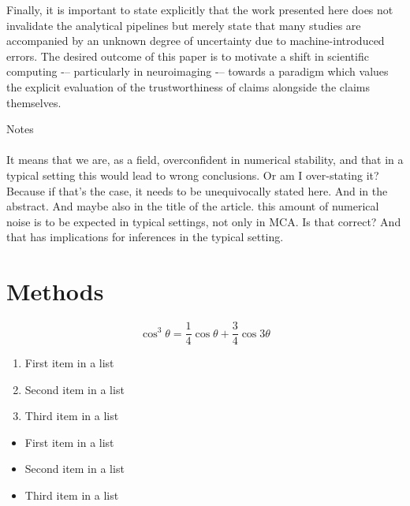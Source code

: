 \documentclass[fleqn,10pt]{SelfArx} %
\begin{document}
Finally, it is important to state explicitly that the work presented here does not invalidate the analytical pipelines
but merely state that many studies are accompanied by an unknown degree of uncertainty due to machine-introduced
errors. The desired outcome of this paper is to motivate a shift in scientific computing -– particularly in
neuroimaging -– towards a paradigm which values the explicit evaluation of the trustworthiness of claims alongside the
claims themselves.

{\color{orange}Notes\\\\
It means that we are, as a field, overconfident in numerical stability, and that in a typical setting this would lead
to wrong conclusions. Or am I over-stating it? Because if that's the case, it needs to be unequivocally stated here.
And in the abstract. And maybe also in the title of the article. this amount of numerical noise is to be expected in
typical settings, not only in MCA. Is that correct? And that has implications for inferences in the typical setting.
}
 
 


\clearpage
\section*{Methods}
\begin{equation}
\cos^3 \theta =\frac{1}{4}\cos\theta+\frac{3}{4}\cos 3\theta
\label{eq:refname2}
\end{equation}

\lipsum[10] %

\begin{enumerate}[noitemsep] %
\item First item in a list
\item Second item in a list
\item Third item in a list
\end{enumerate}

\lipsum[14] %

\begin{itemize}[noitemsep] %
\item First item in a list
\item Second item in a list
\item Third item in a list
\end{itemize}
\end{document}
